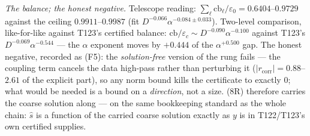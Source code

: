 \documentclass[11pt,a4paper]{article}
\begin{document}
\emph{The balance; the honest negative.} Telescope reading:
$\sum_\ell\mathrm{cb}_\ell/\varepsilon_0=0.6404$--$0.9729$ against the ceiling
$0.9911$--$0.9987$ (fit $D^{-0.066}\alpha^{-0.084\pm0.033}$). Two-level comparison,
like-for-like against T123's certified balance: $\mathrm{cb}/\varepsilon_c\sim
D^{-0.090}\alpha^{-0.100}$ against T123's $D^{-0.069}\alpha^{-0.544}$ --- the $\alpha$
exponent moves by $+0.444$ of the $\alpha^{+0.500}$ gap. The honest negative, recorded as
(F5): the \emph{solution-free} version of the rung fails --- the coupling term cancels the
data high-pass rather than perturbing it ($|r_{\mathrm{corr}}|=0.88$--$2.61$ of the explicit
part), so any norm bound kills the certificate to exactly $0$; what would be needed is a
bound on a \emph{direction}, not a size. (8R) therefore carries the coarse solution along
--- on the same bookkeeping standard as the whole chain: $\hat s$ is a function of the
carried coarse solution exactly as $y$ is in T122/T123's own certified supplies.
\end{document}
